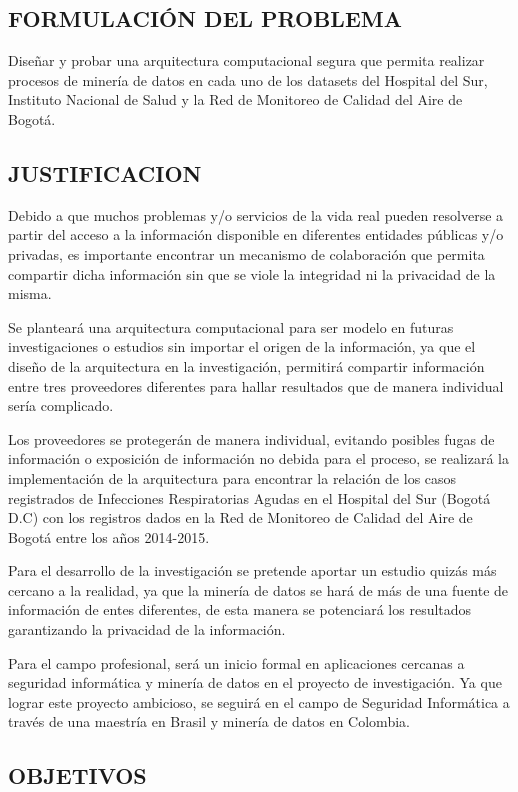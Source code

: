 \documentclass[a4paper, 11pt, oneside]{article}
\theoremstyle{definition}
\theoremstyle{remark}
\begin{document}
\subsection{FORMULACIÓN DEL PROBLEMA}
Diseñar y probar una arquitectura computacional segura que permita realizar procesos de minería de datos en cada uno de los datasets del Hospital del Sur, Instituto Nacional de Salud y la Red de Monitoreo de Calidad del Aire de Bogotá.

\subsection{JUSTIFICACION}

Debido a que muchos problemas y/o servicios de la vida real pueden resolverse a partir del acceso a la información disponible en diferentes entidades públicas y/o privadas, es importante encontrar un mecanismo de colaboración que permita compartir dicha información sin que se viole la integridad ni la privacidad de la misma.

Se planteará una arquitectura computacional para ser modelo en futuras investigaciones o estudios sin importar el origen de la información, ya que el diseño de la arquitectura en la investigación, permitirá compartir información entre tres proveedores diferentes para hallar resultados que de manera individual sería complicado.

Los proveedores se protegerán de manera individual, evitando posibles fugas de información o exposición de información no debida para el proceso, se realizará la implementación de la arquitectura para encontrar la relación de los casos registrados de Infecciones Respiratorias Agudas en el Hospital del Sur (Bogotá D.C) con los registros dados en la Red de Monitoreo de Calidad del Aire de Bogotá entre los años 2014-2015.

Para el desarrollo de la investigación se pretende aportar un estudio quizás más cercano a la realidad, ya que la minería de datos se hará de más de una fuente de información de entes diferentes, de esta manera se potenciará los resultados garantizando la privacidad de la información. 

Para el campo profesional, será un inicio formal en aplicaciones cercanas a seguridad informática y minería de datos en el proyecto de investigación. Ya que lograr este proyecto ambicioso, se seguirá en el campo de Seguridad Informática a través de una maestría en Brasil y minería de datos en Colombia.

\subsection{OBJETIVOS}
\end{document}
